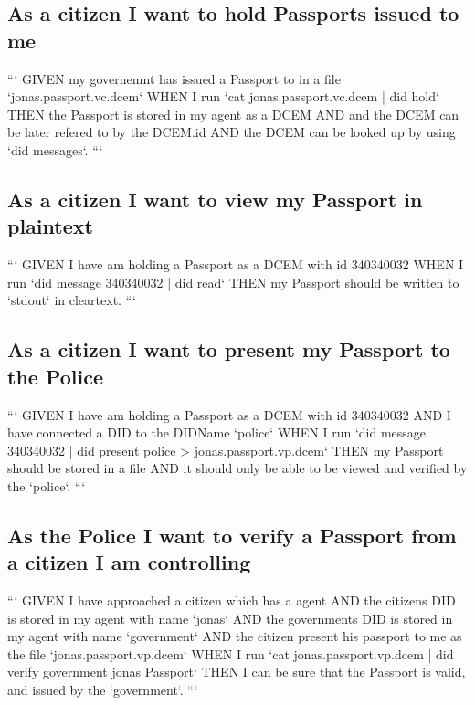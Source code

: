 \subsection{As a citizen I want to hold Passports issued to me}

```
GIVEN my governemnt has issued a Passport to in a file `jonas.passport.vc.dcem`
WHEN  I run `cat jonas.passport.vc.dcem | did hold`
THEN  the Passport is stored in my agent as a DCEM
AND   and the DCEM can be later refered to by the DCEM.id
AND   the DCEM can be looked up by using `did messages`.
```

\subsection{As a citizen I want to view my Passport in plaintext}

```
GIVEN I have am holding a Passport as a DCEM with id 340340032
WHEN  I run `did message 340340032 | did read`
THEN  my Passport should be written to `stdout` in cleartext.
```

\subsection{As a citizen I want to present my Passport to the Police}

```
GIVEN I have am holding a Passport as a DCEM with id 340340032
AND   I have connected a DID to the DIDName `police`
WHEN  I run `did message 340340032 | did present police > jonas.passport.vp.dcem`
THEN  my Passport should be stored in a file
AND   it should only be able to be viewed and verified by the `police`.
```

\subsection{As the Police I want to verify a Passport from a citizen I am controlling}

```
GIVEN I have approached a citizen which has a agent
AND   the citizens DID is stored in my agent with name `jonas`
AND   the governments DID is stored in my agent with name `government`
AND   the citizen present his passport to me as the file `jonas.passport.vp.dcem`
WHEN  I run `cat jonas.passport.vp.dcem | did verify government jonas Passport`
THEN  I can be sure that the Passport is valid, and issued by the `government`.
```
